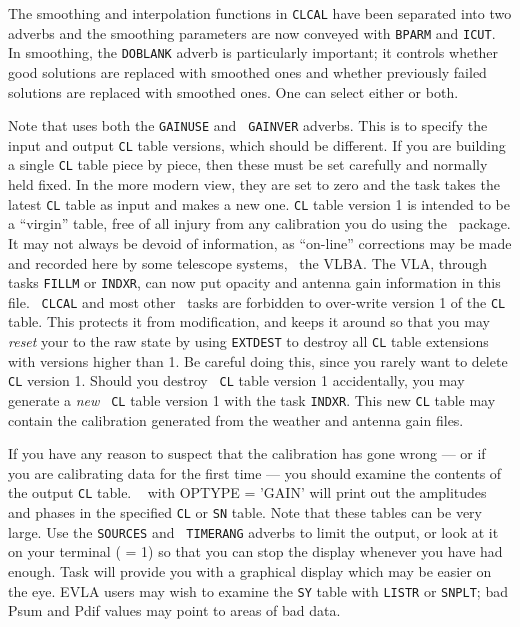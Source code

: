     The smoothing and interpolation functions in {\tt CLCAL} have
been separated into two adverbs and the smoothing parameters are
now conveyed with {\tt BPARM} and {\tt ICUT}\@.  In smoothing, the
{\tt DOBLANK} adverb is particularly important; it controls whether
good solutions are replaced with smoothed ones and whether previously
failed solutions are replaced with smoothed ones.  One can select
either or both.

     Note that {\tt {}} uses both the {\tt GAINUSE} and {\tt
GAINVER} adverbs.  This is to specify the input and output {\tt CL}
table versions, which should be different.  If you are building a
single {\tt CL} table piece by piece, then these must be set carefully
and normally held fixed.  In the more modern view, they are set to
zero and the task takes the latest {\tt CL} table as input and makes a
new one.  {\tt CL} table version 1 is intended to be a ``virgin''
table, free of all injury from any calibration you do using the \AIPS\
package.  It may not always be devoid of information, as ``on-line''
corrections may be made and recorded here by some telescope systems,
\eg\ the VLBA\@.  The VLA, through tasks {\tt FILLM} or {\tt INDXR},
can now put opacity and antenna gain information in this file.  {\tt
CLCAL} and most other \AIPS\ tasks are forbidden to over-write version
1 of the {\tt CL} table.  This protects it from modification, and
keeps it around so that you may {\it reset\/} your 
to the raw state by using {\tt EXTDEST} to destroy all {\tt CL} table
extensions with versions higher than 1.  Be careful doing this, since
you rarely want to delete {\tt CL} version 1.  Should you destroy {\tt
CL} table version 1 accidentally, you may generate a {\it new\/} {\tt
CL} table version 1 with the task {\tt INDXR}\@.  This new {\tt CL}
table may contain the calibration generated from the weather and
antenna gain files.

     If you have any reason to suspect that the calibration has gone
wrong --- or if you are calibrating data for the first time --- you
should examine the contents of the output {\tt CL} table.  {\tt
{}} with {\us OPTYPE = 'GAIN'} will print out the amplitudes
and phases in the specified {\tt CL} or {\tt SN} table.  Note that
these tables can be very large.  Use the {\tt SOURCES} and {\tt
TIMERANG} adverbs to limit the output, or look at it on your terminal
({\us \tndx{DOCRT} = 1}) so that you can stop the display whenever
you have had enough.  Task {\tt \tndx{SNPLT}} will provide you with a
graphical display which may be easier on the eye.  EVLA users may wish
to examine the {\tt SY} table with {\tt LISTR} or {\tt SNPLT}; bad
Psum and Pdif values may point to areas of bad data.

